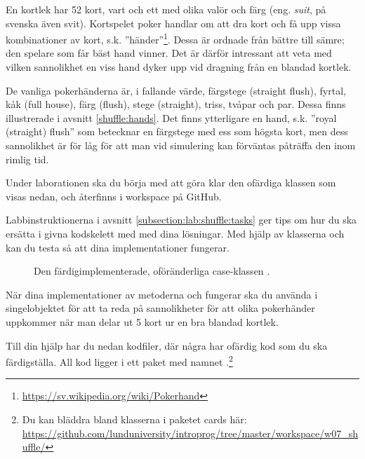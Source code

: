 En kortlek  har 52 kort, vart och ett med olika valör  och färg (eng. \emph{suit}, på svenska även svit). Kortspelet poker handlar om att dra kort och få upp vissa kombinationer av kort, s.k. ''händer''\footnote{\href{https://sv.wikipedia.org/wiki/Pokerhand}{https://sv.wikipedia.org/wiki/Pokerhand}}. Dessa är ordnade från bättre till sämre; den spelare som får bäst hand vinner.
Det är därför intressant att veta med vilken sannolikhet en viss hand dyker upp vid dragning från en blandad kortlek.

De vanliga pokerhänderna är, i fallande värde, färgstege (straight flush), fyrtal, kåk (full house), färg (flush), stege (straight), triss, tvåpar och par. Dessa finns illustrerade i avsnitt \ref{shuffle:hands}.
Det finns ytterligare en hand, s.k. ''royal (straight) flush'' som betecknar en färgstege med ess som högsta kort, men dess sannolikhet är för låg för att man vid simulering kan förväntas påträffa den inom rimlig tid.

Under laborationen ska du börja med att göra klar den ofärdiga klassen  som visas nedan, och återfinns i workspace på GitHub.



Labbinstruktionerna i avsnitt \ref{subsection:lab:shuffle:tasks} ger tips om hur du ska ersätta  i givna kodskelett med med dina lösningar.
Med hjälp av klasserna  och  kan du testa så att dina implementationer fungerar.

\begin{figure}
\caption{Den färdigimplementerade, oföränderliga case-klassen .}
\label{shuffle:fig-card}
\end{figure}




När dina implementationer av metoderna  och  fungerar ska du använda  i singelobjektet  för att ta reda på sannolikheter för att olika pokerhänder uppkommer när man delar ut 5 kort ur en bra blandad kortlek.

Till din hjälp har du nedan kodfiler, där några har ofärdig kod som du ska färdigställa. All kod  ligger i ett paket med namnet .\footnote{Du kan bläddra bland klasserna i paketet cards här: \\
\href{https://github.com/lunduniversity/introprog/tree/master/workspace/w07_shuffle/}{\mbox{\fontsize{9}{11}\selectfont  https://github.com/lunduniversity/introprog/tree/master/workspace/w07\_shuffle/}}}

